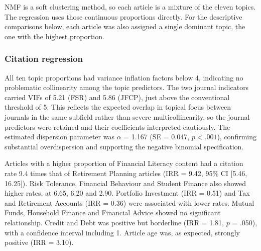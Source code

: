 \documentclass[11pt,a4paper]{article}
\begin{document}
NMF is a soft clustering method, so each article is a mixture of the eleven topics. The regression uses those continuous proportions directly. For the descriptive comparisons below, each article was also assigned a single dominant topic, the one with the highest proportion.

\subsubsection{Citation regression}\label{qb-citation-regression}

All ten topic proportions had variance inflation factors below 4, indicating no problematic collinearity among the topic predictors. The two journal indicators carried VIFs of 5.21 (FSR) and 5.86 (JFCP), just above the conventional threshold of 5. This reflects the expected overlap in topical focus between journals in the same subfield rather than severe multicollinearity, so the journal predictors were retained and their coefficients interpreted cautiously. The estimated dispersion parameter was \(\alpha\) = 1.167 (SE = 0.047, \(p < .001\)), confirming substantial overdispersion and supporting the negative binomial specification.

Articles with a higher proportion of Financial Literacy content had a citation rate 9.4 times that of Retirement Planning articles (IRR = 9.42, 95\% CI [5.46, 16.25]). Risk Tolerance, Financial Behaviour and Student Finance also showed higher rates, at 6.65, 6.20 and 2.90. Portfolio Investment (IRR = 0.51) and Tax and Retirement Accounts (IRR = 0.36) were associated with lower rates. Mutual Funds, Household Finance and Financial Advice showed no significant relationship. Credit and Debt was positive but borderline (IRR = 1.81, \(p\) = .050), with a confidence interval including 1. Article age was, as expected, strongly positive (IRR = 3.10).
\end{document}
